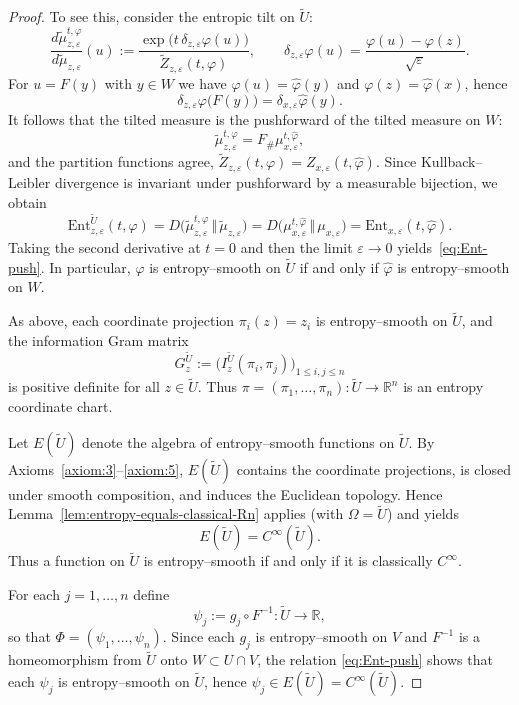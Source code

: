 \documentclass[11pt]{amsart}
\theoremstyle{definition}
\theoremstyle{remark}
\begin{document}
\begin{proof}
To see this, consider the entropic tilt on $\widetilde U$:
\[
\frac{d\widetilde\mu^{t,\varphi}_{z,\varepsilon}}{d\widetilde\mu_{z,\varepsilon}}(u)
:=\frac{\exp\bigl(t\,\delta_{z,\varepsilon}\varphi(u)\bigr)}{\widetilde Z_{z,\varepsilon}(t,\varphi)},
\qquad
\delta_{z,\varepsilon}\varphi(u)=\frac{\varphi(u)-\varphi(z)}{\sqrt\varepsilon}.
\]
For $u=F(y)$ with $y\in W$ we have $\varphi(u)=\widehat\varphi(y)$ and $\varphi(z)=\widehat\varphi(x)$, hence
\[
\delta_{z,\varepsilon}\varphi\bigl(F(y)\bigr)=\delta_{x,\varepsilon}\widehat\varphi(y).
\]
It follows that the tilted measure is the pushforward of the tilted measure on $W$:
\[
\widetilde\mu^{t,\varphi}_{z,\varepsilon}=F_\#\mu^{t,\widehat\varphi}_{x,\varepsilon},
\]
and the partition functions agree, $\widetilde Z_{z,\varepsilon}(t,\varphi)=Z_{x,\varepsilon}(t,\widehat\varphi)$. Since
Kullback--Leibler divergence is invariant under pushforward by a measurable bijection, we obtain
\[
\mathrm{Ent}^{\widetilde U}_{z,\varepsilon}(t,\varphi)
= D\bigl(\widetilde\mu^{t,\varphi}_{z,\varepsilon}\,\Vert\,\widetilde\mu_{z,\varepsilon}\bigr)
= D\bigl(\mu^{t,\widehat\varphi}_{x,\varepsilon}\,\Vert\,\mu_{x,\varepsilon}\bigr)
=\mathrm{Ent}_{x,\varepsilon}(t,\widehat\varphi).
\]
Taking the second derivative at $t=0$ and then the limit $\varepsilon\to0$ yields~\eqref{eq:Ent-push}.
In particular, $\varphi$ is entropy--smooth on $\widetilde U$ if and only if $\widehat\varphi$ is entropy--smooth on $W$.

As above, each coordinate projection $\pi_i(z)=z_i$ is entropy--smooth on
$\widetilde U$, and the information Gram matrix
\[
G^{\widetilde U}_z := \bigl(I^{\widetilde U}_z(\pi_i,\pi_j)\bigr)_{1\le i,j\le n}
\]
is positive definite for all $z\in\widetilde U$. Thus
$\pi=(\pi_1,\dots,\pi_n):\widetilde U\to\mathbb{R}^n$ is an entropy coordinate chart.

Let $E(\widetilde U)$ denote the algebra of entropy--smooth functions on
$\widetilde U$. By Axioms~\ref{axiom:3}--\ref{axiom:5}, $E(\widetilde U)$ contains
the coordinate projections, is closed under smooth composition, and induces
the Euclidean topology. Hence Lemma~\ref{lem:entropy-equals-classical-Rn} applies
(with $\Omega=\widetilde U$) and yields
\[
E(\widetilde U)= C^\infty(\widetilde U).
\]
Thus a function on $\widetilde U$ is entropy--smooth if and only if it is
classically $C^\infty$.

For each $j=1,\dots,n$ define
\[
\psi_j := g_j\circ F^{-1} : \widetilde U \longrightarrow \mathbb{R},
\]
so that $\Phi = (\psi_1,\dots,\psi_n)$. Since each $g_j$ is entropy--smooth on $V$ and
$F^{-1}$ is a homeomorphism from $\widetilde U$ onto $W\subset U\cap V$, the relation
\eqref{eq:Ent-push} shows that each $\psi_j$ is entropy--smooth on $\widetilde U$, hence
$\psi_j\in E(\widetilde U)=C^\infty(\widetilde U)$.


\end{proof}
\end{document}
